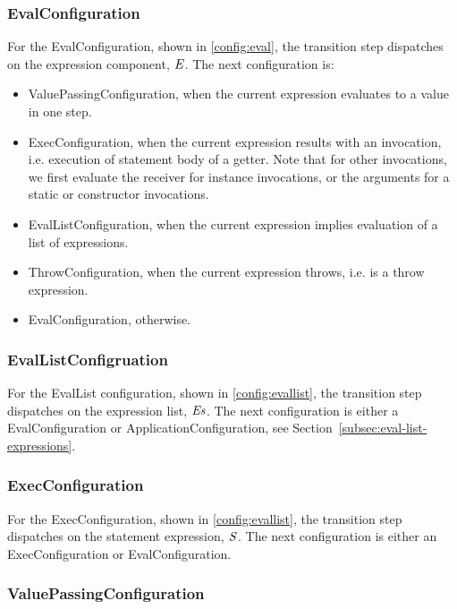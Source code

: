 \documentclass{article}
\begin{document}
\subsubsection{EvalConfiguration}
\label{subsubsec:evalconfig}

For the EvalConfiguration, shown in \ref{config:eval}, the transition step dispatches on the expression component, $\mathit{E}$.
The next configuration is:
\begin{itemize}
\item ValuePassingConfiguration, when the current expression evaluates to a value in one step.
\item ExecConfiguration, when the current expression results with an invocation, i.e. execution of statement body of a getter.
Note that for other invocations, we first evaluate the receiver for instance invocations, or the arguments for a static or constructor invocations.
\item EvalListConfiguration, when the current expression implies evaluation of a list of expressions.
\item ThrowConfiguration, when the current expression throws, i.e. is a throw expression.
\item EvalConfiguration, otherwise.
\end{itemize}

\subsubsection{EvalListConfigruation}
\label{subsubsec:evallistconfig}

For the EvalList configuration, shown in \ref{config:evallist}, the transition step dispatches on the expression list, $\mathit{E}\mathit{s}$.
The next configuration is either a EvalConfiguration or ApplicationConfiguration, see Section~\ref{subsec:eval-list-expressions}.

\subsubsection{ExecConfiguration}
\label{subsubsec:execconfig}

For the ExecConfiguration, shown in \ref{config:evallist}, the transition step dispatches on the statement expression, $\mathit{S}$.
The next configuration is either an ExecConfiguration or EvalConfiguration.

\subsubsection{ValuePassingConfiguration}
\label{suubsubsec:valuepassingconfig}
\end{document}

